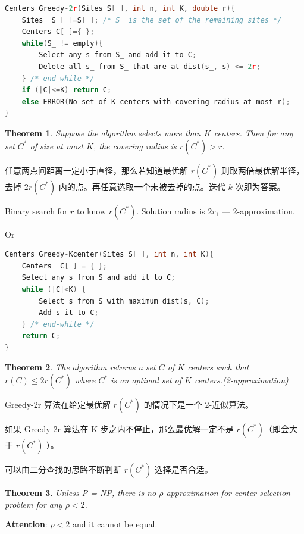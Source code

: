 \documentclass{article}
\newtheorem*{Theorem}{Theorem}
\begin{document}
\begin{lstlisting}[language={c}]
Centers Greedy-2r(Sites S[ ], int n, int K, double r){
    Sites  S_[ ]=S[ ]; /* S_ is the set of the remaining sites */
    Centers C[ ]={ };
    while(S_ != empty){
        Select any s from S_ and add it to C;
        Delete all s_ from S_ that are at dist(s_, s) <= 2r;
    } /* end-while */
    if (|C|<=K) return C;
    else ERROR(No set of K centers with covering radius at most r);
}
\end{lstlisting}
\begin{Theorem}
    Suppose the algorithm selects more than $K$ centers.  Then for any set $C^*$ of size at most $K$, the covering radius is $r(C^*) > r$.
\end{Theorem}

任意两点间距离一定小于直径，那么若知道最优解 $r(C^*)$ 则取两倍最优解半径，去掉 $2r(C^*)$ 内的点。再任意选取一个未被去掉的点。迭代 $k$ 次即为答案。

Binary search for $r$ to know $r(C^*)$. Solution radius is $2r_1$ --- 2-approximation. 

Or
\begin{lstlisting}[language={c}]
Centers Greedy-Kcenter(Sites S[ ], int n, int K){
    Centers  C[ ] = { };
    Select any s from S and add it to C;
    while (|C|<K) {
        Select s from S with maximum dist(s, C);
        Add s it to C;
    } /* end-while */
    return C;
}
\end{lstlisting}
\begin{Theorem}
    The algorithm returns a set $C$ of $K$ centers such that $r(C) \le 2r(C^*)$ where $C^*$ is an optimal set of $K$ centers.(2-approximation)
\end{Theorem}\par

Greedy-2r 算法在给定最优解 $r(C^*)$ 的情况下是一个 2-近似算法。

如果 Greedy-2r 算法在 K 步之内不停止，那么最优解一定不是 $r(C^*)$（即会大于 $r(C^*)$ ）。

可以由二分查找的思路不断判断 $r(C^*)$ 选择是否合适。

\begin{Theorem}
    Unless P = NP, there is no  $\rho$-approximation for center-selection problem for any $\rho < 2$.
\end{Theorem}

\textbf{Attention}: $\rho < 2$ and it cannot be equal.
\end{document}
